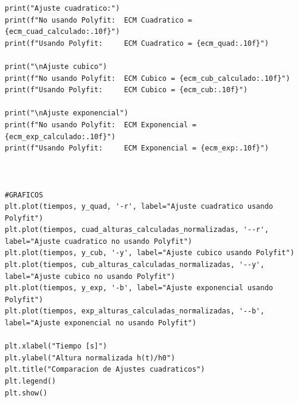 \documentclass{article}
\begin{document}
\begin{lstlisting}
print("Ajuste cuadratico:")
print(f"No usando Polyfit:  ECM Cuadratico = {ecm_cuad_calculado:.10f}")
print(f"Usando Polyfit:     ECM Cuadratico = {ecm_quad:.10f}")

print("\nAjuste cubico")
print(f"No usando Polyfit:  ECM Cubico = {ecm_cub_calculado:.10f}")
print(f"Usando Polyfit:     ECM Cubico = {ecm_cub:.10f}")

print("\nAjuste exponencial")
print(f"No usando Polyfit:  ECM Exponencial = {ecm_exp_calculado:.10f}")
print(f"Usando Polyfit:     ECM Exponencial = {ecm_exp:.10f}")



#GRAFICOS
plt.plot(tiempos, y_quad, '-r', label="Ajuste cuadratico usando Polyfit")
plt.plot(tiempos, cuad_alturas_calculadas_normalizadas, '--r', label="Ajuste cuadratico no usando Polyfit")
plt.plot(tiempos, y_cub, '-y', label="Ajuste cubico usando Polyfit")
plt.plot(tiempos, cub_alturas_calculadas_normalizadas, '--y', label="Ajuste cubico no usando Polyfit")
plt.plot(tiempos, y_exp, '-b', label="Ajuste exponencial usando Polyfit")
plt.plot(tiempos, exp_alturas_calculadas_normalizadas, '--b', label="Ajuste exponencial no usando Polyfit")

plt.xlabel("Tiempo [s]")
plt.ylabel("Altura normalizada h(t)/h0")
plt.title("Comparacion de Ajustes cuadraticos")
plt.legend()
plt.show()
\end{lstlisting}
\end{document}
